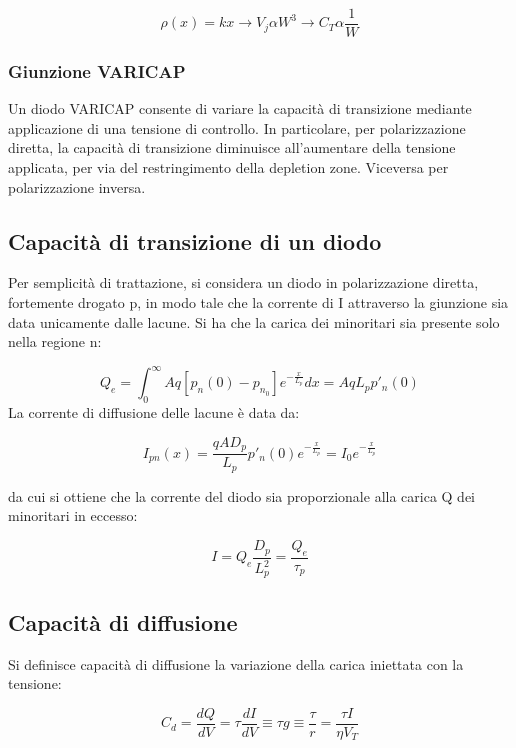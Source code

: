 \documentclass{article}
\begin{document}
\begin{equation}
    \rho(x)=kx \rightarrow V_j \alpha W^3 \rightarrow C_T \alpha \frac{1}{W}
\end{equation}


\subsubsection{Giunzione VARICAP}

Un diodo VARICAP consente di variare la capacità di transizione mediante applicazione di una tensione di controllo.
In particolare, per polarizzazione diretta, la capacità di transizione diminuisce all'aumentare della tensione applicata,
per via del restringimento della depletion zone. Viceversa per polarizzazione inversa.

\subsection{Capacità di transizione di un diodo}
Per semplicità di trattazione, si considera un diodo in polarizzazione diretta, fortemente drogato p, in modo tale che la corrente
di I attraverso la giunzione sia data unicamente dalle lacune.
Si ha che la carica dei minoritari sia presente solo nella regione n:

\begin{equation}
    Q_e=\int_{0}^{\infty}Aq[p_n(0)-p_{n_0}]e^{-\frac{x}{L_p}}dx=AqL_pp'_n(0)
\end{equation}
La corrente di diffusione delle lacune è data da:

\begin{equation}
    I_{pn}(x)=\frac{qAD_p}{L_p}p'_n(0)e^{-\frac{x}{L_p}}=I_0e^{-\frac{x}{L_p}}
\end{equation}

da cui si ottiene che la corrente del diodo sia proporzionale alla carica Q dei minoritari in eccesso:

\begin{equation}
    I=Q_e\frac{D_p}{L_p^2}=\frac{Q_e}{\tau_p}
\end{equation}

\subsection{Capacità di diffusione}
Si definisce capacità di diffusione la variazione della carica iniettata con la tensione:

\begin{equation}
    C_d=\frac{dQ}{dV}=\tau \frac{dI}{dV}\equiv \tau g\equiv \frac{\tau}{r}= \frac{\tau I}{\eta V_T}
\end{equation}
\end{document}
